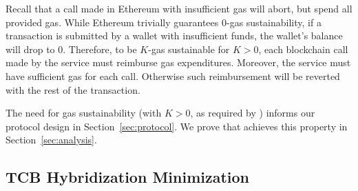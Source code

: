 Recall that a call made in Ethereum with insufficient gas will abort, but spend all provided gas. While Ethereum trivially guarantees 0-gas sustainability, if a transaction is submitted by a wallet with insufficient funds, the wallet's balance will drop to 0.
Therefore, to be $K$-gas sustainable for $K > 0$, each blockchain call made by the service must reimburse gas expenditures.
Moreover, the service must have sufficient gas for each call. Otherwise such reimbursement will be reverted with the rest of the transaction.

The need for gas sustainability (with $K > 0$, as required by \tc) informs our protocol design in Section~\ref{sec:protocol}. We prove that \tc achieves this property in Section~\ref{sec:analysis}.

\subsection{TCB Hybridization Minimization}
\label{sec:tcb-hybridization}


